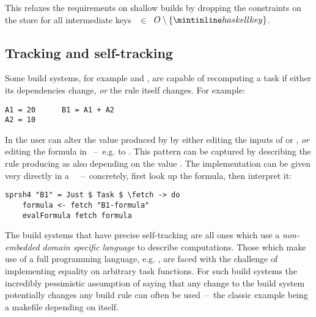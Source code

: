 \noindent
This relaxes the requirements on shallow builds by dropping the constraints on
the  store for all intermediate keys ~$\in$~$O\setminus \{\hs{key}\}$.

\subsection{Tracking and self-tracking}\label{sec-tracking-aspects}

Some build systems, for example \Excel and \Ninja, are capable of recomputing a task if either its dependencies change, \emph{or} the rule itself changes. For example:

\begin{verbatim}
A1 = 20      B1 = A1 + A2
A2 = 10
\end{verbatim}

\noindent
In \Excel the user can alter the value produced by  by either editing
the inputs of  or , \emph{or} editing the formula in
~--~e.g. to . This pattern can be captured by describing
the rule producing  as also depending on the value .
The implementation can be given very directly in a
~~--~concretely, first look up the formula, then interpret
it:

\begin{verbatim}
sprsh4 "B1" = Just $ Task $ \fetch -> do
    formula <- fetch "B1-formula"
    evalFormula fetch formula
\end{verbatim}


\noindent
The build systems that have precise self-tracking are all ones which use a
\emph{non-embedded domain specific language} to describe computations.
Those which make use of a full programming language, e.g. \Shake, are faced with
the challenge of implementing equality on arbitrary task functions. For such
build systems the incredibly pessimistic assumption of saying that any change to
the build system potentially changes any build rule can often be used~--~the
classic example being a makefile depending on itself.

